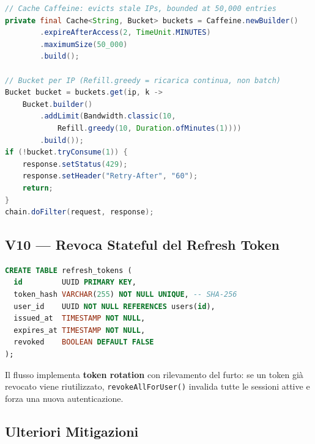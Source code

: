 \documentclass[12pt, a4paper]{article}
\begin{document}
    \begin{lstlisting}[language=Java, caption={RateLimitFilter.java --- logica token-bucket con Caffeine}]
// Cache Caffeine: evicts stale IPs, bounded at 50,000 entries
private final Cache<String, Bucket> buckets = Caffeine.newBuilder()
        .expireAfterAccess(2, TimeUnit.MINUTES)
        .maximumSize(50_000)
        .build();

// Bucket per IP (Refill.greedy = ricarica continua, non batch)
Bucket bucket = buckets.get(ip, k ->
    Bucket.builder()
        .addLimit(Bandwidth.classic(10,
            Refill.greedy(10, Duration.ofMinutes(1))))
        .build());
if (!bucket.tryConsume(1)) {
    response.setStatus(429);
    response.setHeader("Retry-After", "60");
    return;
}
chain.doFilter(request, response);
    \end{lstlisting}

    \subsection{V10 --- Revoca Stateful del Refresh Token}

    \begin{lstlisting}[language=SQL, caption={Schema tabella refresh\_tokens}]
CREATE TABLE refresh_tokens (
  id         UUID PRIMARY KEY,
  token_hash VARCHAR(255) NOT NULL UNIQUE, -- SHA-256
  user_id    UUID NOT NULL REFERENCES users(id),
  issued_at  TIMESTAMP NOT NULL,
  expires_at TIMESTAMP NOT NULL,
  revoked    BOOLEAN DEFAULT FALSE
);
    \end{lstlisting}

    Il flusso implementa \textbf{token rotation} con rilevamento del furto:
    se un token già revocato viene riutilizzato, \texttt{revokeAllForUser()}
    invalida tutte le sessioni attive e forza una nuova autenticazione.

    \subsection{Ulteriori Mitigazioni}
\end{document}
